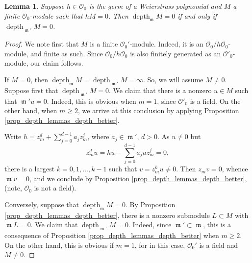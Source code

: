 \documentclass{amsart}
\numberwithin{equation}{section}
\theoremstyle{definition}
\theoremstyle{plain}
\newtheorem{lemma}[definition]{Lemma}
\theoremstyle{remark}
\begin{document}
\begin{lemma}\label{lemma_depth_lemmas_ind_on_dim}
Suppose $h\in{\ensuremath{\mathcal{{O}}}}_0$ is the germ of a Weierstrass polynomial and
$M$ a finite ${\ensuremath{\mathcal{{O}}}}_0$-module such that $hM=0$. Then
${\mathop{\mathrm{depth}}\nolimits _{{\mathop{\mathfrak{m}}}}} M=0$ if and only if ${\mathop{\mathrm{depth}}\nolimits _{{{{\mathop{\mathfrak{m}}}}'}}}M=0$.
\end{lemma}
\begin{proof}
We note first that $M$ is a finite ${\ensuremath{\mathcal{{O}}}}_0'$-module. Indeed,
it is an ${\ensuremath{\mathcal{{O}}}}_0/h{\ensuremath{\mathcal{{O}}}}_0$-module, and finite as such.
Since ${\ensuremath{\mathcal{{O}}}}_0/h{\ensuremath{\mathcal{{O}}}}_0$ is also finitely generated as an 
${\ensuremath{\mathcal{{O}}}}'_0$-module, our claim follows.

If $M=0$, then ${\mathop{\mathrm{depth}}\nolimits _{{\mathop{\mathfrak{m}}}}} M={\mathop{\mathrm{depth}}\nolimits _{{{{\mathop{\mathfrak{m}}}}'}}}M=\infty$. So, we 
will assume $M\not=0$.
Suppose first 
that ${\mathop{\mathrm{depth}}\nolimits _{{{{\mathop{\mathfrak{m}}}}'}}}M=0$. 
We claim that 
there is a nonzero $u\in M$ such that ${{\mathop{\mathfrak{m}}}}' u=0$.
Indeed, this is obvious when $m=1$, since ${\ensuremath{\mathcal{{O}}}}'_0$ is a
field. On the other hand,
when $m\geq 2$, we arrive at this conclusion by applying Proposition 
\ref{prop_depth_lemmas_depth_better}.  

Write $h=z_m^d+\sum_{j=0}^{d-1}a_jz_m^j$, where $a_j\in{{\mathop{\mathfrak{m}}}}'$, $d>0$. As
$u\not=0$ but
\[
	z_m^du=hu-\sum_{j=0}^{d-1}a_juz_m^j=0,
\]
there is a largest $k=0,1,\ldots,k-1$ such that $v=z_m^ku\not=0$.
Then $z_mv=0$, whence ${{\mathop{\mathfrak{m}}}} v=0$, and we conclude by Proposition 
\ref{prop_depth_lemmas_depth_better}, (note, ${\ensuremath{\mathcal{{O}}}}_0$ is not a field).

Conversely, suppose that ${\mathop{\mathrm{depth}}\nolimits _{{\mathop{\mathfrak{m}}}}} M=0$. By Proposition
\ref{prop_depth_lemmas_depth_better}, there is a nonzero submodule $L\subset M$
with ${{\mathop{\mathfrak{m}}}} L=0$. We claim that ${\mathop{\mathrm{depth}}\nolimits _{{{{\mathop{\mathfrak{m}}}}'}}} M=0$. 
Indeed, since ${{\mathop{\mathfrak{m}}}}'\subset{{\mathop{\mathfrak{m}}}}$, this is a consequence of
 Proposition \ref{prop_depth_lemmas_depth_better} when $m\geq 2$.
On the other hand, this is obvious if $m=1$, for in this case, ${\ensuremath{\mathcal{{O}}}}_0'$ is a field and
 $M\not=0$.
\end{proof}
\end{document}

